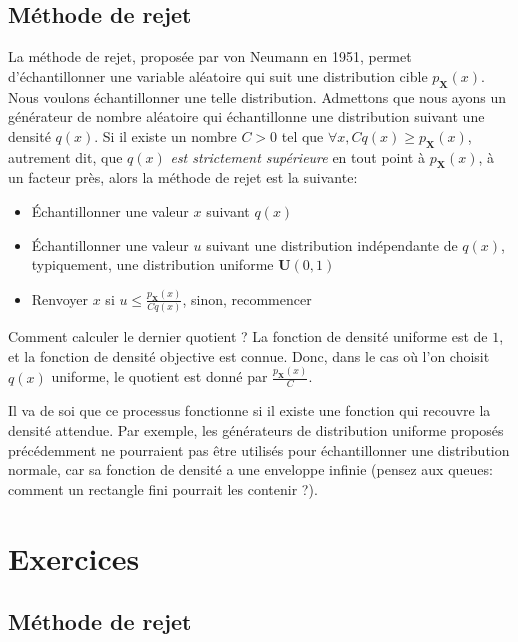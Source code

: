         \subsection{Méthode de rejet}
            La méthode de rejet, proposée par von Neumann en 1951, permet d'échantillonner une variable aléatoire qui suit une distribution cible $p_{\mathbf{X}}(x)$.
            Nous voulons échantillonner une telle distribution.
            Admettons que nous ayons un générateur de nombre aléatoire qui échantillonne une distribution suivant une densité $q(x)$. Si il existe un nombre $C>0$ tel que $\forall x, Cq(x) \geq p_{\mathbf{X}}(x)$, autrement dit, que $q(x)$ \textit{est strictement supérieure} en tout point à $p_{\mathbf{X}}(x)$, à un facteur près, alors la méthode de rejet est la suivante:
            \begin{itemize}
                \item Échantillonner une valeur $x$ suivant $q(x)$
                \item Échantillonner une valeur $u$ suivant une distribution indépendante de $q(x)$, typiquement, une distribution uniforme $\mathbf{U}(0, 1)$
                \item Renvoyer $x$ si $u \leq \frac{p_{\mathbf{X}}(x)}{C q(x)}$, sinon, recommencer
            \end{itemize}
            Comment calculer le dernier quotient ? La fonction de densité uniforme est de $1$, et la fonction de densité objective est connue. Donc, dans le cas où l'on choisit $q(x)$ uniforme, le quotient est donné par $\frac{p_{\mathbf{X}}(x)}{C}$.
            
            Il va de soi que ce processus fonctionne si il existe une fonction qui recouvre la densité attendue. Par exemple, les générateurs de distribution uniforme proposés précédemment ne pourraient pas être utilisés pour échantillonner une distribution normale, car sa fonction de densité a une enveloppe infinie (pensez aux queues: comment un rectangle fini pourrait les contenir ?).

    \section{Exercices}
        \subsection{Méthode de rejet}
